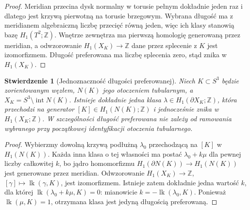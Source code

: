 \documentclass[11pt,a4paper]{report}
\numberwithin{equation}{section}
\theoremstyle{plain}
\newtheorem{stwierdzenie}[twierdzenie]{Stwierdzenie}
\theoremstyle{definition}
\theoremstyle{remark}
\begin{document}
\begin{proof}
Meridian przecina dysk normalny w torusie pełnym dokładnie
jeden raz i dlatego jest krzywą pierwotną na torusie brzegowym.
Wybrana długość ma z meridianem algebraiczną liczbę przecięć
równą jeden, więc ich klasy stanowią bazę $H_1(T^2;\mathbb Z)$.
Wnętrze zewnętrza ma pierwszą homologię generowaną przez
meridian, a odwzorowanie $H_1(X_K)\to\mathbb Z$ dane przez
splecenie z $K$ jest izomorfizmem. Długość preferowana
ma liczbę splecenia zero, stąd znika w $H_1(X_K)$.
\end{proof}

\begin{stwierdzenie}[Jednoznaczność długości preferowanej]
Niech $K\subset S^3$ będzie zorientowanym węzłem, $N(K)$ jego
otoczeniem tubularnym, a $X_K=S^3\setminus\operatorname{int}N(K)$.
Istnieje dokładnie jedna klasa $\lambda\in H_1(\partial X_K;\mathbb Z)$,
która przechodzi na generator $[K]\in H_1(N(K);\mathbb Z)$
i jednocześnie znika w $H_1(X_K;\mathbb Z)$.
W szczególności długość preferowana nie zależy od ramowania
wybranego przy początkowej identyfikacji otoczenia tubularnego.
\end{stwierdzenie}

\begin{proof}
Wybierzmy dowolną krzywą podłużną $\lambda_0$ przechodzącą
na $[K]$ w $H_1(N(K))$. Każda inna klasa o tej własności
ma postać $\lambda_0+k\mu$ dla pewnej liczby całkowitej $k$,
bo jądro homomorfizmu $H_1(\partial N(K))\to H_1(N(K))$
jest generowane przez meridian. Odwzorowanie
$H_1(X_K)\to\mathbb Z$, $[\gamma]\mapsto
\operatorname{lk}(\gamma,K)$, jest izomorfizmem.
Istnieje zatem dokładnie jedna wartość $k$, dla której
$\operatorname{lk}(\lambda_0+k\mu,K)=0$: mianowicie
$k=-\operatorname{lk}(\lambda_0,K)$.
Ponieważ $\operatorname{lk}(\mu,K)=1$, otrzymana
klasa jest jedyną długością preferowaną.
\end{proof}

\begin{center}
\end{center}
\end{document}
